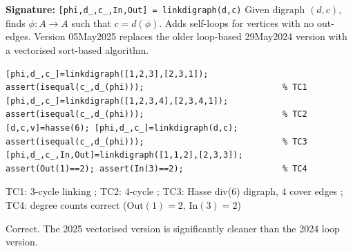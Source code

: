 \chapter{}
\begin{tcolorbox}[Abox,title={Analysis}]
\textbf{Signature:} \lstinline|[phi,d_,c_,In,Out] = linkdigraph(d,c)|\quad
Given digraph $(d,c)$, finds $\phi:A\to A$ such that $c=d(\phi)$. Adds self-loops for vertices with no out-edges. Version 05May2025 replaces the older loop-based 29May2024 version with a vectorised sort-based algorithm.
\end{tcolorbox}
\begin{lstlisting}[caption={Tests for linkdigraph.m}]
[phi,d_,c_]=linkdigraph([1,2,3],[2,3,1]);
assert(isequal(c_,d_(phi)));                            % TC1
[phi,d_,c_]=linkdigraph([1,2,3,4],[2,3,4,1]);
assert(isequal(c_,d_(phi)));                            % TC2
[d,c,v]=hasse(6); [phi,d_,c_]=linkdigraph(d,c);
assert(isequal(c_,d_(phi)));                            % TC3
[phi,d_,c_,In,Out]=linkdigraph([1,1,2],[2,3,3]);
assert(Out(1)==2); assert(In(3)==2);                    % TC4
\end{lstlisting}
\begin{tcolorbox}[Pbox,title={TC1--TC4 -- All pass}]
TC1: 3-cycle linking \APROVADO; TC2: 4-cycle \APROVADO; TC3: Hasse div(6) digraph, 4 cover edges \APROVADO; TC4: degree counts correct ($\mathrm{Out}(1)=2$, $\mathrm{In}(3)=2$) \APROVADO
\end{tcolorbox}
\begin{concl}
Correct. The 2025 vectorised version is significantly cleaner than the 2024 loop version.
\end{concl}

